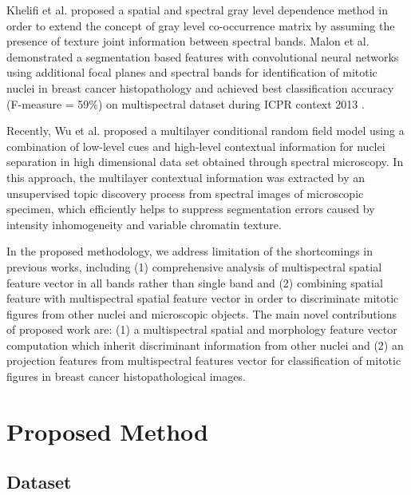 \documentclass[10pt,twocolumn,letterpaper]{article}
\begin{document}
Khelifi et al. \cite{khelifi2012} proposed a spatial and spectral gray level dependence method in order to extend the concept of gray level co-occurrence matrix by assuming the presence of texture joint information between spectral bands. Malon et al. \cite{malon2013} demonstrated a segmentation based features with convolutional neural networks using additional focal planes and spectral bands for identification of mitotic nuclei in breast cancer histopathology and achieved best classification accuracy (F-measure = 59\%) on multispectral dataset during ICPR context 2013 \cite{roux2013}.

Recently, Wu et al. \cite{wu2012} proposed a multilayer conditional random field model using a combination of low-level cues and high-level contextual information for nuclei separation in high dimensional data set obtained through spectral microscopy. In this approach, the multilayer contextual information was extracted by an unsupervised topic discovery process from spectral images of microscopic specimen, which efficiently helps to suppress segmentation errors caused by intensity inhomogeneity and variable chromatin texture.

In the proposed methodology, we address limitation of the shortcomings in previous works, including (1) comprehensive analysis of multispectral spatial feature vector in all bands rather than single band \cite{masood2009,wu2009,wu2012} and (2) combining spatial feature with multispectral spatial feature vector in order to discriminate mitotic figures from other nuclei and microscopic objects. The main novel contributions of proposed work are: (1) a multispectral spatial and morphology feature vector computation which inherit discriminant information from other nuclei and (2) an projection features from multispectral features vector for classification of mitotic figures in breast cancer histopathological images.

\section{Proposed Method}
\label{sec:framework}
\subsection{Dataset}
\end{document}
